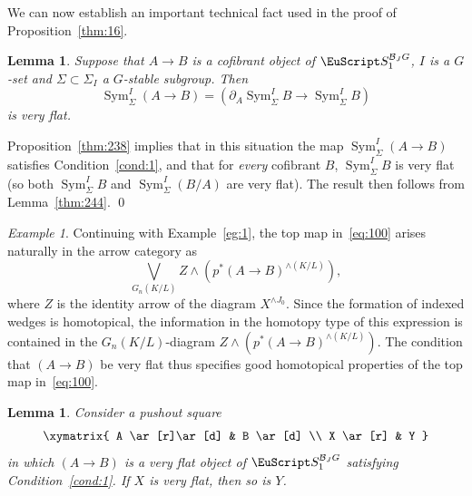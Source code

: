 \documentclass{amsart}
\newtheorem{lem}[equation]{Lemma}
\theoremstyle{definition}
\theoremstyle{remark}
\newtheorem{eg}[equation]{Example}
\newenvironment{pf}{\bigskip{\em Proof:\/}}{\qed\medskip}
\DeclareMathOperator{\sym}{Sym}
\newcommand{\spectra}{\EuScript S}
\newcommand{\cat}[1]{{\mathcal #1}}
\newcommand{\aspectra}[1]{\spectra_{1}^{#1}}
\begin{document}
We can now establish an important technical fact used in the proof of
Proposition~\ref{thm:16}.

\begin{lem}
\label{thm:242}
Suppose that $A\to B$ is a cofibrant object of
$\aspectra{\cat{B}_{J}G}$, $I$ is a $G$-set and $\Sigma\subset
\Sigma_{I}$ a $G$-stable subgroup.   Then 
\[
\sym^{I}_{\Sigma} (A\to B) = (\partial_{A}\sym^{I}_{\Sigma}B\to \sym^{I}_{\Sigma}B)
\]
is very flat. 
\end{lem}

\begin{pf}
Proposition~\ref{thm:238} implies that in this situation the map
$\sym^{I}_{\Sigma}(A\to B)$ satisfies Condition~\ref{cond:1}, and that
for {\em every} cofibrant $B$, $\sym^{I}_{\Sigma}B$ is very flat (so
both $\sym^{I}_{\Sigma}B$ and $\sym^{I}_{\Sigma}(B/A)$ are very flat).
The result then follows from Lemma~\ref{thm:244}.
\end{pf}

\begin{eg}
\label{eg:2}
Continuing with Example~\ref{eg:1}, the top map in~\eqref{eq:100}
arises naturally in the arrow category as 
\[
\bigvee_{G_{n}(K/L)} Z\wedge (p^{\ast} (A\to B)^{\wedge(K/L)}),
\]
where $Z$ is the identity arrow of the diagram $X^{\wedge J_{0}}$.
Since the formation of indexed wedges is homotopical, the information
in the homotopy type of this expression is contained in the
$G_{n}(K/L)$-diagram $Z\wedge (p^{\ast} (A\to B)^{\wedge(K/L)})$.  The
condition that $(A\to B)$ be very flat thus specifies good homotopical
properties of the top map in~\eqref{eq:100}.
\end{eg}

\begin{lem}
\label{thm:193}
Consider a pushout square 
\begin{equation}
\label{eq:125}
\xymatrix{
A  \ar[r]\ar[d]  & B  \ar[d] \\
X  \ar[r]        & Y
}
\end{equation}
in which $(A\to B)$ is a very flat object of $\aspectra{\cat B_{J}G}$
satisfying Condition~\ref{cond:1}.  If $X$ is very flat, then so is
$Y$.
\end{lem}
\end{document}
